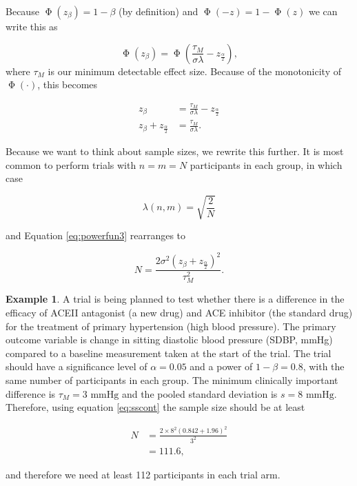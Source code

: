 \documentclass[
  openany]{book}
\theoremstyle{definition}
\theoremstyle{definition}
\newtheorem{example}{Example}[chapter]
\theoremstyle{definition}
\theoremstyle{definition}
\theoremstyle{remark}
\begin{document}
Because \(\operatorname{\Phi}\left(z_\beta\right) = 1 - \beta\) (by definition) and \(\operatorname{\Phi}\left(-z\right) = 1 - \operatorname{\Phi}\left(z\right)\) we can write this as

\[ \operatorname{\Phi}\left(z_\beta\right) = \operatorname{\Phi}\left(\frac{\tau_M}{\sigma\lambda} - z_{\frac{\alpha}{2}}\right), \]
where \(\tau_M\) is our minimum detectable effect size. Because of the monotonicity of \(\operatorname{\Phi}\left(\cdot\right)\), this becomes

\begin{equation}
\begin{aligned}
  z_\beta & = \frac{\tau_M}{\sigma\lambda} - z_{\frac{\alpha}{2}} \\
  z_\beta + z_{\frac{\alpha}{2}} & = \frac{\tau_M}{\sigma\lambda}.
\end{aligned}
\label{eq:powerfun3}
\end{equation}

Because we want to think about sample sizes, we rewrite this further. It is most common to perform trials with \(n=m=N\) participants in each group, in which case

\[ \lambda\left(n,m\right) = \sqrt{\frac{2}{N}}\]

and Equation \eqref{eq:powerfun3} rearranges to

\begin{equation}
    N = \frac{2\sigma^2\left(z_\beta + z_{\frac{\alpha}{2}}\right)^2}{\tau_M^2}.
    \label{eq:sscont}
\end{equation}

\begin{example}
\protect\hypertarget{exm:sseg1}{}\label{exm:sseg1}\citep[from][]{zhong2009calculate}
A trial is being planned to test whether there is a difference in the efficacy of ACEII antagonist (a new drug) and ACE inhibitor (the standard drug) for the treatment of primary hypertension (high blood pressure). The primary outcome variable is change in sitting diastolic blood pressure (SDBP, mmHg) compared to a baseline measurement taken at the start of the trial. The trial should have a significance level of \(\alpha=0.05\) and a power of \(1-\beta = 0.8\), with the same number of participants in each group. The minimum clinically important difference is \(\tau_M = 3 \text{ mmHg}\) and the pooled standard deviation is \(s = 8 \text{ mmHg}\). Therefore, using equation \eqref{eq:sscont} the sample size should be at least

\begin{align*}
      N & = \frac{2\times{8}^2\left(0.842 + 1.96\right)^2}{3^2}\\
      & = 111.6,
\end{align*}

and therefore we need at least 112 participants in each trial arm.
\end{example}
\end{document}
